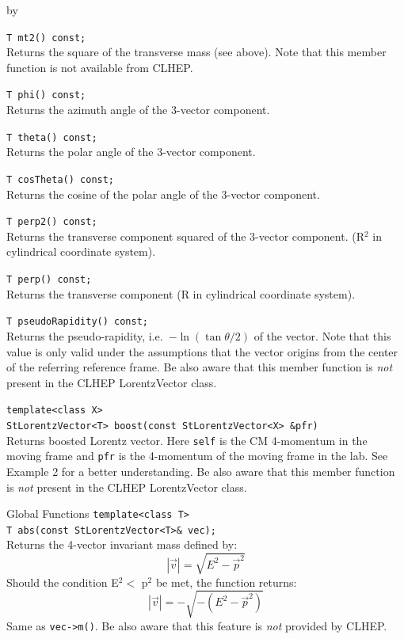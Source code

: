 \documentclass[twoside]{article}
\newcommand{\comp}[1]{\texttt{#1}}%
\newcommand{\entrylabel}[1]{\mbox{\textbf{{#1}}}\hfil}%
\newenvironment{entry}
{\begin{list}{}%
    {\renewcommand{\makelabel}{\entrylabel}%
     \setlength{\labelwidth}{90pt}%
     \setlength{\leftmargin}{\labelwidth}
     \advance\leftmargin by \labelsep%
      }%
    }%
  {\end{list}}
\newcommand{\Entrylabel}[1]%
{\raisebox{0pt}[1ex][0pt]{\makebox[\labelwidth][l]%
    {\parbox[t]{\labelwidth}{\hspace{0pt}\textbf{{#1}}}}}}
\newenvironment{Entry}%
{\renewcommand{\entrylabel}{\Entrylabel}\begin{entry}}%
  {\end{entry}}
\begin{document}
\begin{description}
\begin{Entry}
    \verb+T mt2() const;+\\    
    Returns the square of the transverse mass (see above).
    Note that this member function is not available
    from CLHEP.
    
    \verb+T phi() const;+\\
    Returns the azimuth angle of the 3-vector component.
    
    \verb+T theta() const;+\\
    Returns the polar angle of the 3-vector component.
    
    \verb+T cosTheta() const;+\\
    Returns the cosine of the polar angle of the 3-vector component.
       
    \verb+T perp2() const;+\\
    Returns the transverse component squared of the 3-vector component.
    (R$^2$ in cylindrical coordinate system).
    
    \verb+T perp() const;+\\
    Returns the transverse component
    (R in cylindrical coordinate system). 
    
    \verb+T pseudoRapidity() const;+\\
    Returns the pseudo-rapidity, i.e.~$-\ln(\tan \theta/2)$ of the
    vector. Note that this value is only valid under the assumptions
    that the vector origins from the center of the referring
    reference frame. Be also aware that this member function is
    {\em not} present in the CLHEP LorentzVector class.

    \verb+template<class X>+\\
    \verb+StLorentzVector<T> boost(const StLorentzVector<X> &pfr)+\\  
    Returns boosted Lorentz vector.
    Here \comp{self} is the CM 4-momentum in the moving frame and
    \comp{pfr} is the 4-momentum of the moving frame in the lab.
    See Example 2 for a better understanding.    
    Be also aware that this member function is
    {\em not} present in the CLHEP LorentzVector class.
    
\item[Global Functions]
    \verb+template<class T>+\\
    \verb+T abs(const StLorentzVector<T>& vec);+\\ 
    Returns the 4-vector invariant mass defined
    by:
    \begin{equation*}
      |\vec{v}| = \sqrt{E^{2} - \vec{p}^{2}}
    \end{equation*}
    Should the condition E$^{2} < $ p$^{2}$ be met, the
    function returns:
   \begin{equation*}
      |\vec{v}| = -\sqrt{-(E^{2} - \vec{p}^{2})}
    \end{equation*}
    Same as
    \verb+vec->m()+.
    Be also aware that this feature is {\em not} provided by
    CLHEP.
    

\end{Entry}
\end{description}
\end{document}
